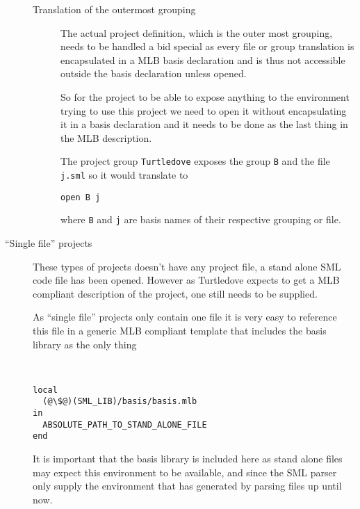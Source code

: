 \begin{description}
\begin{description}
  \item[Translation of the outermost grouping] 

    The actual project definition, which is the outer most grouping, needs to be
    handled a bid special as every file or group translation is encapsulated in
    a MLB basis declaration and is thus not accessible outside the basis
    declaration unless opened. 

    So for the project to be able to expose anything to the environment trying
    to use this project we need to open it without encapsulating it in a basis
    declaration and it needs to be done as the last thing in the MLB
    description.

    The project group \texttt{Turtledove} exposes the group \texttt{B} and the
    file \texttt{j.sml} so it would translate to

\begin{lstlisting}
open B j
\end{lstlisting}

    where \texttt{B} and \texttt{j} are basis names of their respective grouping
    or file.

  \end{description}



\item[``Single file'' projects] These types of projects doesn't have any project
  file, a stand alone SML code file has been opened. However as Turtledove
  expects to get a MLB compliant description of the project, one still needs to
  be supplied.

  As ``single file'' projects only contain one file it is very easy to reference
  this file in a generic MLB compliant template that includes the basis library
  as the only thing

  \begin{example}\
\begin{lstlisting}
local
  (@\$@)(SML_LIB)/basis/basis.mlb
in
  ABSOLUTE_PATH_TO_STAND_ALONE_FILE
end
\end{lstlisting}
  \end{example}

  It is important that the basis library is included here as stand alone files
  may expect this environment to be available, and since the SML parser only
  supply the environment that has generated by parsing files up until now.
  
\end{description}

